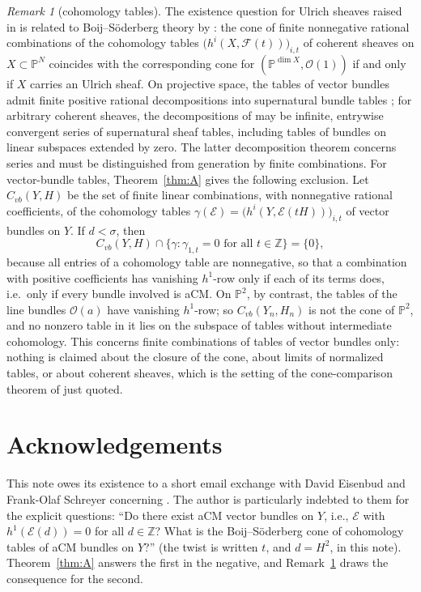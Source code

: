 \documentclass[11pt]{amsart}
\theoremstyle{remark}
\newtheorem{remark}[theorem]{Remark}
\theoremstyle{definition}
\newcommand{\PP}{\mathbb{P}}
\newcommand{\ZZ}{\mathbb{Z}}
\newcommand{\cO}{\mathcal{O}}
\newcommand{\cE}{\mathcal{E}}
\newcommand{\cF}{\mathcal{F}}
\begin{document}
\begin{remark}[cohomology tables]\label{rem:bs}
The existence question for Ulrich sheaves raised in \cite{ES} is related to Boij--S\"oderberg theory by \cite[Thm.~5.3]{ES11}: the cone of finite nonnegative rational combinations of the cohomology tables $\bigl(h^i(X,\cF(t))\bigr)_{i,t}$ of coherent sheaves on $X\subset\PP^N$ coincides with the corresponding cone for $(\PP^{\dim X},\cO(1))$ if and only if $X$ carries an Ulrich sheaf. On projective space, the tables of vector bundles admit finite positive rational decompositions into supernatural bundle tables \cite{ES09}; for arbitrary coherent sheaves, the decompositions of \cite{ES10} may be infinite, entrywise convergent series of supernatural sheaf tables, including tables of bundles on linear subspaces extended by zero. The latter decomposition theorem concerns series and must be distinguished from generation by finite combinations.
For vector-bundle tables, Theorem~\ref{thm:A} gives the following exclusion. Let $C_{vb}(Y,H)$ be the set of finite linear combinations, with nonnegative rational coefficients, of the cohomology tables $\gamma(\cE)=\bigl(h^i(Y,\cE(tH))\bigr)_{i,t}$ of vector bundles on $Y$. If $d<\sigma$, then
\[
C_{vb}(Y,H)\cap\bigl\{\gamma:\gamma_{1,t}=0\text{ for all }t\in\ZZ\bigr\}=\{0\},
\]
because all entries of a cohomology table are nonnegative, so that a combination with positive coefficients has vanishing $h^1$-row only if each of its terms does, i.e.\ only if every bundle involved is aCM. On $\PP^2$, by contrast, the tables of the line bundles $\cO(a)$ have vanishing $h^1$-row; so $C_{vb}(Y_n,H_n)$ is not the cone of $\PP^2$, and no nonzero table in it lies on the subspace of tables without intermediate cohomology. This concerns finite combinations of tables of vector bundles only: nothing is claimed about the closure of the cone, about limits of normalized tables, or about coherent sheaves, which is the setting of the cone-comparison theorem of \cite[Thm.~5.3]{ES11} just quoted.
\end{remark}

\section*{Acknowledgements}

This note owes its existence to a short email exchange with David Eisenbud and Frank-Olaf Schreyer concerning \cite{An}. The author is particularly indebted to them for the explicit questions: ``Do there exist aCM vector bundles on $Y$, i.e., $\cE$ with $h^1(\cE(d))=0$ for all $d\in\ZZ$? What is the Boij--S\"oderberg cone of cohomology tables of aCM bundles on $Y$?'' (the twist is written $t$, and $d=H^2$, in this note). Theorem~\ref{thm:A} answers the first in the negative, and Remark~\ref{rem:bs} draws the consequence for the second.
\end{document}

